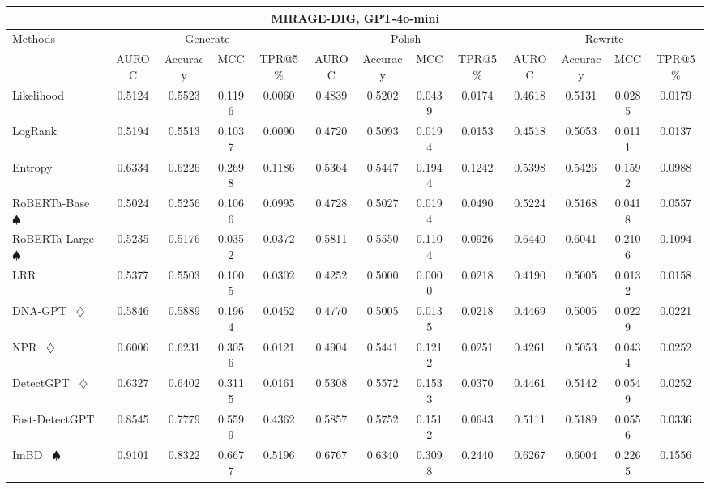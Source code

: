 \begin{table*}[h]
{\begin{tabular}{l|cccc|cccc|cccc}
    \hline

    \hline
    \multicolumn{13}{c}{\textbf{MIRAGE-DIG, GPT-4o-mini}}\\
    \hline

    \hline

    \hline
    \multirow{2}{*}{Methods}&\multicolumn{4}{c|}{Generate}&\multicolumn{4}{c|}{Polish}&\multicolumn{4}{c}{Rewrite} \\
    &  AUROC  &  Accuracy  &  MCC  &  TPR@5\%  &  AUROC  &  Accuracy  &  MCC  &  TPR@5\%  &  AUROC  &  Accuracy  &  MCC  &  TPR@5\%  \\
    \hline

    \hline
    Likelihood~\cite{likelihood} & 0.5124 & 0.5523 & 0.1196 & 0.0060 & 0.4839 & 0.5202 & 0.0439 & 0.0174 & 0.4618 & 0.5131 & 0.0285 & 0.0179 \\
    LogRank~\cite{logrank} & 0.5194 & 0.5513 & 0.1037 & 0.0090 & 0.4720 & 0.5093 & 0.0194 & 0.0153 & 0.4518 & 0.5053 & 0.0111 & 0.0137 \\
    Entropy~\cite{entropy} & 0.6334 & 0.6226 & 0.2698 & 0.1186 & 0.5364 & 0.5447 & 0.1944 & 0.1242 & 0.5398 & 0.5426 & 0.1592 & 0.0988 \\
    RoBERTa-Base~\cite{roberta} $\spadesuit$ & 0.5024 & 0.5256 & 0.1066 & 0.0995 & 0.4728 & 0.5027 & 0.0194 & 0.0490 & 0.5224 & 0.5168 & 0.0418 & 0.0557 \\
    RoBERTa-Large~\cite{roberta} $\spadesuit$ & 0.5235 & 0.5176 & 0.0352 & 0.0372 & 0.5811 & 0.5550 & 0.1104 & 0.0926 & 0.6440 & 0.6041 & 0.2106 & 0.1094 \\
    LRR~\cite{lrrandnpr} & 0.5377 & 0.5503 & 0.1005 & 0.0302 & 0.4252 & 0.5000 & 0.0000 & 0.0218 & 0.4190 & 0.5005 & 0.0132 & 0.0158 \\
    DNA-GPT~\cite{dna-gpt} $\diamondsuit$ & 0.5846 & 0.5889 & 0.1964 & 0.0452 & 0.4770 & 0.5005 & 0.0135 & 0.0218 & 0.4469 & 0.5005 & 0.0229 & 0.0221 \\
    NPR~\cite{lrrandnpr} $\diamondsuit$ & 0.6006 & 0.6231 & 0.3056 & 0.0121 & 0.4904 & 0.5441 & 0.1212 & 0.0251 & 0.4261 & 0.5053 & 0.0434 & 0.0252 \\
    DetectGPT~\cite{detectgpt} $\diamondsuit$ & 0.6327 & 0.6402 & 0.3115 & 0.0161 & 0.5308 & 0.5572 & 0.1533 & 0.0370 & 0.4461 & 0.5142 & 0.0549 & 0.0252 \\
    Fast-DetectGPT~\cite{fastdetectgpt} & 0.8545 & 0.7779 & 0.5599 & 0.4362 & 0.5857 & 0.5752 & 0.1512 & 0.0643 & 0.5111 & 0.5189 & 0.0556 & 0.0336 \\
    ImBD~\cite{imbd} $\spadesuit$ & 0.9101 & 0.8322 & 0.6677 & 0.5196 & 0.6767 & 0.6340 & 0.3098 & 0.2440 & 0.6267 & 0.6004 & 0.2265 & 0.1556 \\
    \hline
    

\end{tabular}}
\end{table*}
